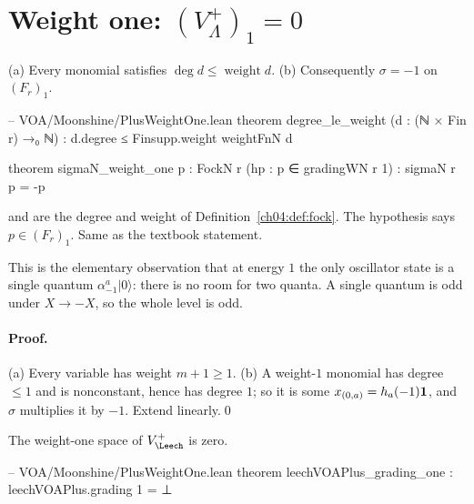 \section{Weight one: \texorpdfstring{$(V_\Lambda^+)_1=0$}{(V+)1 = 0}}\label{ch04:sec:wtone}

\begin{lemma}\label{ch04:lem:degwt}
(a) Every monomial satisfies $\deg d\le\operatorname{weight}d$. (b) Consequently $\sigma=-1$ on
$(F_r)_1$.
\end{lemma}

\begin{leancode}
-- VOA/Moonshine/PlusWeightOne.lean
theorem degree_le_weight (d : (ℕ × Fin r) →₀ ℕ) :
    d.degree ≤ Finsupp.weight weightFnN d

theorem sigmaN_weight_one {p : FockN r} (hp : p ∈ gradingWN r 1) : sigmaN r p = -p
\end{leancode}

\begin{dictionary}
 and  are the degree and weight of
Definition~\ref{ch04:def:fock}. The hypothesis  says $p\in(F_r)_1$. Same as the textbook
statement.
\end{dictionary}

\begin{physics}
This is the elementary observation that at energy $1$ the only oscillator state is a single quantum $\alpha^a_{-1}|0\rangle$: there is no room for two quanta. A single quantum is odd under $X\to-X$, so the whole level is odd.
\end{physics}

\paragraph{Proof.} (a) Every variable has weight $m+1\ge1$. (b) A weight-$1$ monomial has degree
$\le1$ and is nonconstant, hence has degree $1$; so it is some $x_{(0,a)}=h_a(-1)\mathbf{1}$, and
$\sigma$ multiplies it by $-1$. Extend linearly.\qed

\begin{theorem}[$(V_\Leech^+)_1=0$]\label{ch04:thm:wtone}
The weight-one space of $V_\Leech^+$ is zero.
\end{theorem}

\begin{leancode}
-- VOA/Moonshine/PlusWeightOne.lean
theorem leechVOAPlus_grading_one : leechVOAPlus.grading 1 = ⊥
\end{leancode}


